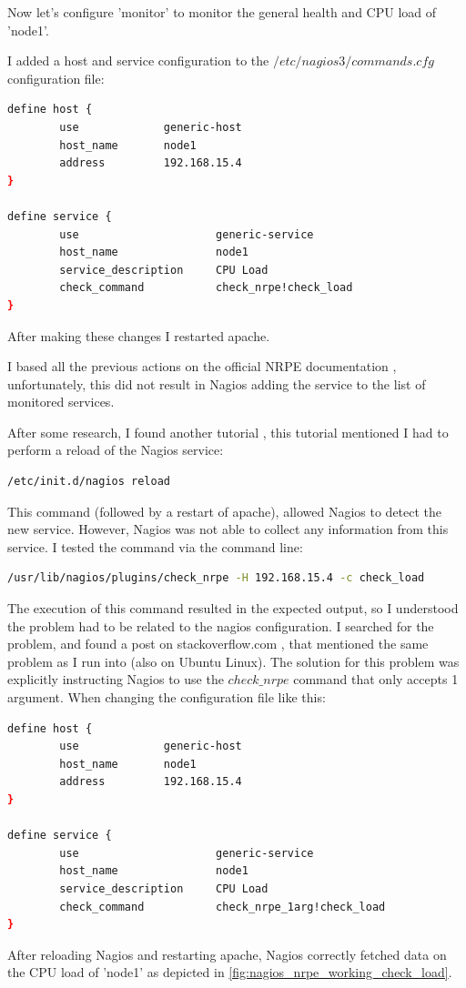 \documentclass[12pt]{report}
\begin{document}
Now let's configure 'monitor' to monitor the general health and CPU load of  'node1'.

I added a host and service configuration to the
$/etc/nagios3/commands.cfg$ configuration file:
\begin{lstlisting}[language=bash]
define host {
        use             generic-host
        host_name       node1
        address         192.168.15.4
}

define service {
        use                     generic-service
        host_name               node1
        service_description     CPU Load
        check_command           check_nrpe!check_load
}
\end{lstlisting}
After making these changes I restarted apache.

I based all the previous actions on the official NRPE documentation
\cite{nrpe_doc}, unfortunately, this did not result in Nagios adding
the service to the list of monitored services.

After some research, I found another tutorial
\cite{nrpe_config_tutorial},
this tutorial mentioned I had to perform a reload of the Nagios
service:
\begin{lstlisting}[language=bash]
  /etc/init.d/nagios reload 
\end{lstlisting} 
This command (followed by a restart of apache), allowed Nagios to
detect the new service.
However, Nagios was not able to collect any information from this
service. I tested the command via the command line:
\begin{lstlisting}[language=bash]
  /usr/lib/nagios/plugins/check_nrpe -H 192.168.15.4 -c check_load
\end{lstlisting} 
The execution of this command resulted in the expected output, 
so I understood the problem had to be related to the nagios
configuration.
I searched for the problem, and found a post on stackoverflow.com
\cite{stackoverflow_nagios},
that mentioned the same problem as I run into (also on Ubuntu Linux). 
The solution for this problem was explicitly instructing Nagios to
use the $check\_nrpe$ command that only accepts 1 argument.
When changing the configuration file like this:
\begin{lstlisting}[language=bash]
define host {
        use             generic-host
        host_name       node1
        address         192.168.15.4
}

define service {
        use                     generic-service
        host_name               node1
        service_description     CPU Load
        check_command           check_nrpe_1arg!check_load
}
\end{lstlisting}
After reloading Nagios and restarting apache, Nagios correctly fetched data
on the CPU load of 'node1' as depicted in
\cref{fig:nagios_nrpe_working_check_load}.
\end{document}
